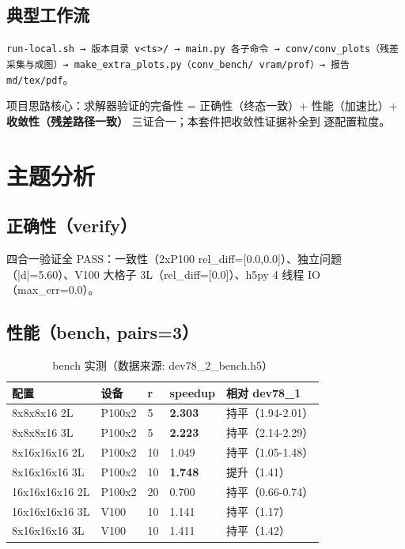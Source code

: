 \documentclass[UTF8]{ctexart}
\begin{document}
\subsection{典型工作流}
\texttt{run-local.sh → 版本目录 v<ts>/ → main.py 各子命令 →
conv/conv\_plots（残差采集与成图）→ make\_extra\_plots.py（conv\_bench/
vram/prof）→ 报告 md/tex/pdf}。

\begin{ideabox}
项目思路核心：求解器验证的完备性 = 正确性（终态一致）+ 性能（加速比）+
\textbf{收敛性（残差路径一致）} 三证合一；本套件把收敛性证据补全到
逐配置粒度。
\end{ideabox}

\section{主题分析}
\subsection{正确性（verify）}
四合一验证全 PASS：一致性（2xP100 rel\_diff=[0.0,0.0]）、独立问题
（|d|=5.60）、V100 大格子 3L（rel\_diff=[0.0]）、h5py 4 线程 IO
（max\_err=0.0）。

\subsection{性能（bench, pairs=3）}
\begin{table}[htbp]\centering
\begin{tabular}{lllll}
\toprule
配置 & 设备 & r & speedup & 相对 dev78\_1 \\
\midrule
8x8x8x16 2L & P100x2 & 5 & \textbf{2.303} & 持平（1.94-2.01） \\
8x8x8x16 3L & P100x2 & 5 & \textbf{2.223} & 持平（2.14-2.29） \\
8x16x16x16 2L & P100x2 & 10 & 1.049 & 持平（1.05-1.48） \\
8x16x16x16 3L & P100x2 & 10 & \textbf{1.748} & 提升（1.41） \\
16x16x16x16 2L & P100x2 & 20 & 0.700 & 持平（0.66-0.74） \\
16x16x16x16 3L & V100 & 10 & 1.141 & 持平（1.17） \\
8x16x16x16 3L & V100 & 10 & 1.411 & 持平（1.42） \\
\bottomrule
\end{tabular}
\caption{bench 实测（数据来源: dev78\_2\_bench.h5）}
\end{table}
\end{document}
